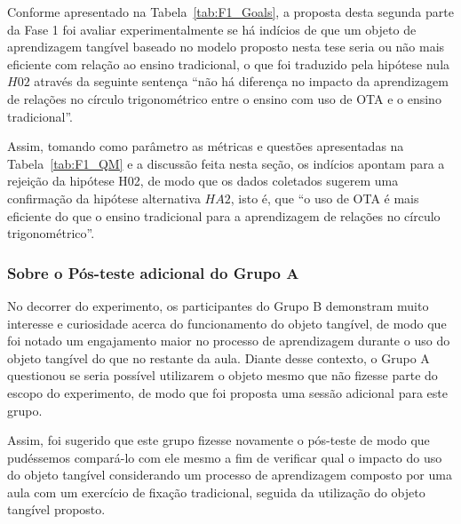 Conforme apresentado na Tabela~\ref{tab:F1_Goals}, a proposta desta segunda parte da Fase 1 foi avaliar experimentalmente se há indícios de que um objeto de aprendizagem tangível baseado no modelo proposto nesta tese seria ou não mais eficiente com relação ao ensino tradicional, o que foi traduzido pela hipótese nula $H02$ através da seguinte sentença ``não há diferença no impacto da aprendizagem de relações no círculo trigonométrico entre o ensino com uso de OTA e o ensino tradicional''.

Assim, tomando como parâmetro as métricas e questões apresentadas na Tabela~\ref{tab:F1_QM} e a discussão feita nesta seção, os indícios apontam para a rejeição da hipótese H02, de modo que os dados coletados sugerem uma confirmação da hipótese alternativa $HA2$, isto é, que ``o uso de OTA é mais eficiente do que o ensino tradicional para a aprendizagem de relações no círculo trigonométrico''.

\subsubsection{Sobre o Pós-teste adicional do Grupo A}\label{subsec:fase1-posteste2}

No decorrer do experimento, os participantes do Grupo B demonstram muito interesse e curiosidade acerca do funcionamento do objeto tangível, de modo que foi notado um engajamento maior no processo de aprendizagem durante o uso do objeto tangível do que no restante da aula. Diante desse contexto, o Grupo A questionou se seria possível utilizarem o objeto mesmo que não fizesse parte do escopo do experimento, de modo que foi proposta uma sessão adicional para este grupo.

Assim, foi sugerido que este grupo fizesse novamente o pós-teste de modo que pudéssemos compará-lo com ele mesmo a fim de verificar qual o impacto do uso do objeto tangível considerando um processo de aprendizagem composto por uma aula com um exercício de fixação tradicional, seguida da utilização do objeto tangível proposto.


